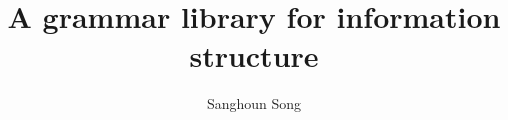 \author{Sanghoun Song}
\title{A grammar library for information structure}
\subtitle{}
\renewcommand{\lsSeries}{tdgi}
\renewcommand{\lsSeriesNumber}{1}
